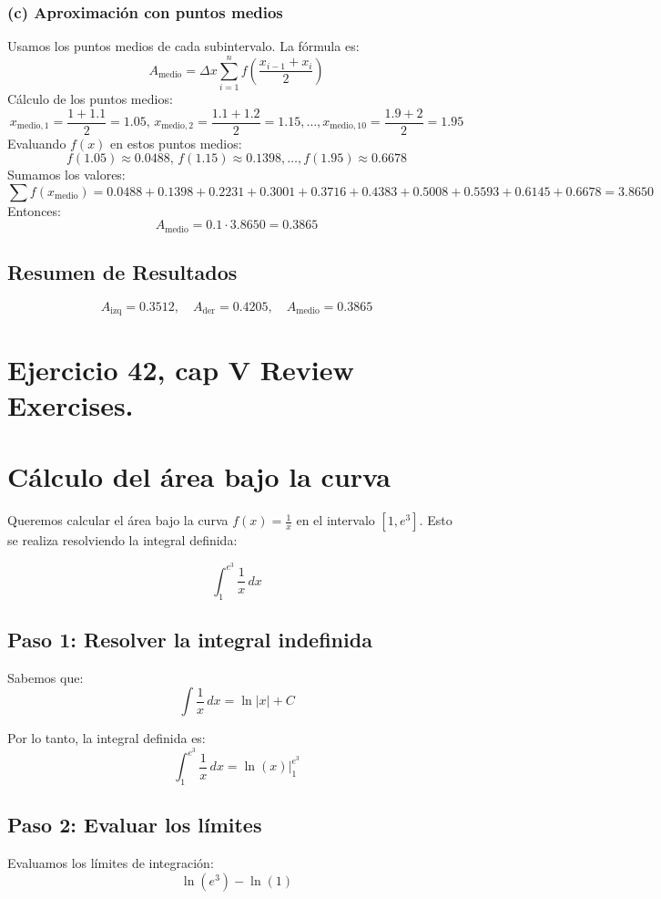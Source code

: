 \documentclass[11pt,letterpaper]{article}
\begin{document}
\subsubsection*{(c) Aproximación con puntos medios}
Usamos los puntos medios de cada subintervalo. La fórmula es:
\[
A_{\text{medio}} = \Delta x \sum_{i=1}^{n} f\left(\frac{x_{i-1} + x_i}{2}\right)
\]
Cálculo de los puntos medios:
\[
x_{\text{medio},1} = \frac{1 + 1.1}{2} = 1.05, \, x_{\text{medio},2} = \frac{1.1 + 1.2}{2} = 1.15, \dots, x_{\text{medio},10} = \frac{1.9 + 2}{2} = 1.95
\]
Evaluando \(f(x)\) en estos puntos medios:
\[
f(1.05) \approx 0.0488, \, f(1.15) \approx 0.1398, \dots, f(1.95) \approx 0.6678
\]
Sumamos los valores:
\[
\sum f(x_{\text{medio}}) = 0.0488 + 0.1398 + 0.2231 + 0.3001 + 0.3716 + 0.4383 + 0.5008 + 0.5593 + 0.6145 + 0.6678 = 3.8650
\]
Entonces:
\[
A_{\text{medio}} = 0.1 \cdot 3.8650 = 0.3865
\]

\subsection*{Resumen de Resultados}
\[
A_{\text{izq}} = 0.3512, \quad A_{\text{der}} = 0.4205, \quad A_{\text{medio}} = 0.3865
\]


\section{Ejercicio 42, cap V Review Exercises.}
\section*{Cálculo del área bajo la curva}

Queremos calcular el área bajo la curva \(f(x) = \frac{1}{x}\) en el intervalo \([1, e^3]\). Esto se realiza resolviendo la integral definida:

\[
\int_{1}^{e^3} \frac{1}{x} \, dx
\]

\subsection*{Paso 1: Resolver la integral indefinida}
Sabemos que:
\[
\int \frac{1}{x} \, dx = \ln|x| + C
\]

Por lo tanto, la integral definida es:
\[
\int_{1}^{e^3} \frac{1}{x} \, dx = \ln(x) \Big|_{1}^{e^3}
\]

\subsection*{Paso 2: Evaluar los límites}
Evaluamos los límites de integración:
\[
\ln(e^3) - \ln(1)
\]
\end{document}
